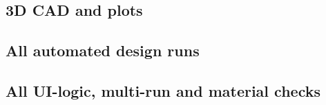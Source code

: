 \documentclass[11pt,a4paper]{article}
\begin{document}
\subsection{3D CAD and plots}\label{sec:cad}


\needspace{0.35\textheight}
\subsection{All automated design runs}\label{sec:allruns}
{\footnotesize\setlength{\tabcolsep}{3pt}\captionsetup{font=normalsize}\setlength{\LTcapwidth}{\linewidth}
}

\needspace{0.3\textheight}
\subsection{All UI-logic, multi-run and material checks}\label{sec:allchecks}
{\small\captionsetup{font=normalsize}\setlength{\LTcapwidth}{\linewidth}
}

\end{document}
